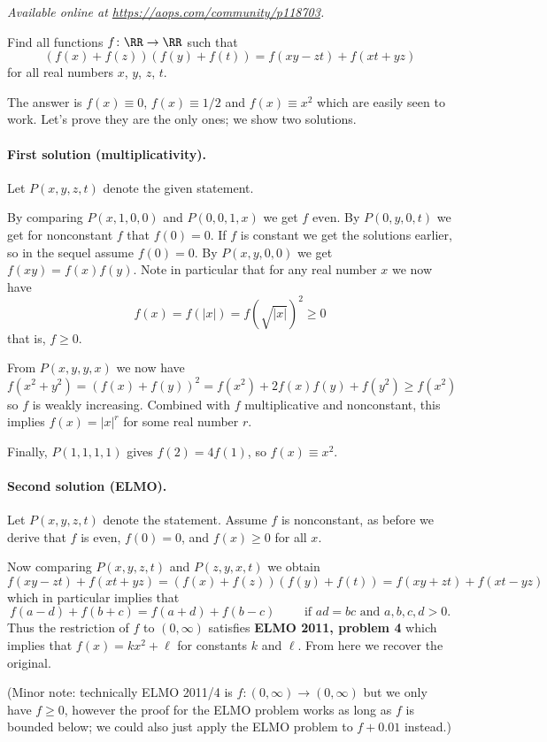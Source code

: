 \textsl{Available online at \url{https://aops.com/community/p118703}.}
\begin{mdframed}[style=mdpurplebox,frametitle={Problem statement}]
Find all functions $f \colon \RR \to \RR$ such that
\[ \left(f(x)+f(z)\right)\left(f(y)+f(t)\right)
  = f(xy-zt)+f(xt+yz) \]
for all real numbers $x$, $y$, $z$, $t$.
\end{mdframed}
The answer is $f(x) \equiv 0$, $f(x) \equiv 1/2$
and $f(x) \equiv x^2$ which are easily seen to work.
Let's prove they are the only ones;
we show two solutions.

\paragraph{First solution (multiplicativity).}
Let $P(x,y,z,t)$ denote the given statement.
\begin{itemize}
  \ii By comparing $P(x,1,0,0)$ and $P(0,0,1,x)$
  we get $\boxed{f \text{ even}}$.
  \ii By $P(0,y,0,t)$ we get for nonconstant $f$
  that $f(0) = 0$.
  If $f$ is constant we get the solutions earlier,
  so in the sequel assume $\boxed{f(0) = 0}$.
  \ii By $P(x,y,0,0)$ we get $\boxed{f(xy) = f(x) f(y)}$.
  Note in particular that for any real number $x$ we now have
  \[ f(x) = f(|x|) = f\left( \sqrt{|x|} \right)^2 \ge 0 \]
  that is, $f \ge 0$.
\end{itemize}

From $P(x,y,y,x)$ we now have
\[ f(x^2 + y^2) = \left( f(x) + f(y) \right)^2
  = f(x^2) + 2f(x)f(y) + f(y^2) \ge f(x^2) \]
so $f$ is weakly increasing.
Combined with $f$ multiplicative and nonconstant,
this implies $f(x) = |x|^r$ for some real number $r$.

Finally, $P(1,1,1,1)$ gives $f(2) = 4f(1)$,
so $f(x) \equiv x^2$.

\paragraph{Second solution (ELMO).}
Let $P(x,y,z,t)$ denote the statement.
Assume $f$ is nonconstant,
as before we derive that $f$ is even, $f(0) = 0$,
and $f(x) \ge 0$ for all $x$.

Now comparing $P(x,y,z,t)$ and $P(z,y,x,t)$ we obtain
\[ f(xy-zt) + f(xt+yz) =
  \left( f(x)+f(z) \right)
  \left( f(y)+f(t) \right)
  = f(xy+zt) + f(xt-yz) \]
which in particular implies that
\[ f(a-d) + f(b+c) = f(a+d) + f(b-c)
\qquad \text{ if } ad=bc \text{ and } a,b,c,d > 0. \]
Thus the restriction of $f$ to $(0,\infty)$ satisfies
\textbf{ELMO 2011, problem 4}
which implies that $f(x) = kx^2+\ell$ for constants $k$ and $\ell$.
From here we recover the original.

(Minor note: technically ELMO 2011/4 is $f \colon (0,\infty) \to (0,\infty)$
but we only have $f \ge 0$,
however the proof for the ELMO problem
works as long as $f$ is bounded below;
we could also just apply the ELMO problem to $f+0.01$ instead.)
\pagebreak
